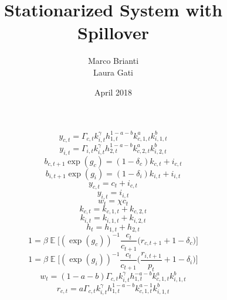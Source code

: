 \documentclass{article}
\title{Stationarized System with Spillover}
\author{Marco Brianti\\Laura Gati}
\date{April 2018}
\DeclareMathOperator{\E}{\mathbb{E}}
\begin{document}
	
	\maketitle

\Large{
	

\begin{equation}
y_{c,t} = \Gamma_{c,t} k_{i,t}^{\gamma} h_{1,t}^{1 - a- b} k_{c,1,t}^a k_{i,1,t}^b
\end{equation}
\begin{equation}
y_{i,t} = \Gamma_{i,t} k_{i,t}^{\gamma} h_{2,t}^{1 - a- b} k_{c,2,t}^a k_{i,2,t}^b
\end{equation}
\begin{equation}
b_{c,t+1} \exp{(g_c)} = (1 - \delta_c)k_{c,t} + i_{c,t}
\end{equation}
\begin{equation}
b_{i,t+1} \exp{(g_i)} = (1 - \delta_i)k_{i,t} + i_{i,t}
\end{equation}
\begin{equation}
y_{c,t} = c_{t} + i_{c,t}
\end{equation}
\begin{equation}
y_{i,t} = i_{i,t}
\end{equation}
\begin{equation}
w_{t} = \chi c_{t}
\end{equation}
\begin{equation}
k_{c,t} = k_{c,1,t} + k_{c,2,t}
\end{equation}
\begin{equation}
k_{i,t} = k_{i,1,t} + k_{i,2,t}
\end{equation}
\begin{equation}
h_{t} = h_{1,t} + h_{2,t}
\end{equation}
\begin{equation}
1 = \beta \E \bigg[ (\exp{(g_c)})^{-1} \frac{c_{t}}{c_{t+1}} \bigg( r_{c,t+1} + 1 - \delta_c   \bigg)     \bigg]
\end{equation}
\begin{equation}
1 = \beta \E \bigg[ (\exp{(g_i)})^{-1} \frac{c_{t}}{c_{t+1}} \bigg( \frac{r_{i,t+1}}{p_t} + 1 - \delta_i  \bigg)     \bigg]
\end{equation}
\begin{equation}
w_t = (1 - a - b)\Gamma_{c,t} k_{i,t}^{\gamma} h_{1,t}^{- a- b} k_{c,1,t}^a k_{i,1,t}^b
\end{equation}
\begin{equation}
r_{c,t} = a \Gamma_{c,t} k_{i,t}^{\gamma} h_{1,t}^{1 - a- b} k_{c,1,t}^{a-1} k_{i,1,t}^b

\end{equation}}
\end{document}
